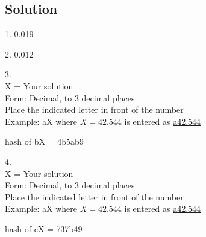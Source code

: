 \subsection*{Solution}
1. \num{0.019}

2. \num{0.012}

3.\\
X = Your solution\\
Form: Decimal, to 3 decimal places\\
Place the indicated letter in front of the number\\
Example: aX where $X=42.544$ is entered as \href{http://www.wolframalpha.com/input/?i=md5+hash+of+\%22a42.544\%22}{a42.544}

hash of bX = 4b5ab9

4.\\
X = Your solution\\
Form: Decimal, to 3 decimal places\\
Place the indicated letter in front of the number\\
Example: aX where $X=42.544$ is entered as \href{http://www.wolframalpha.com/input/?i=md5+hash+of+\%22a42.544\%22}{a42.544}

hash of cX = 737b49
